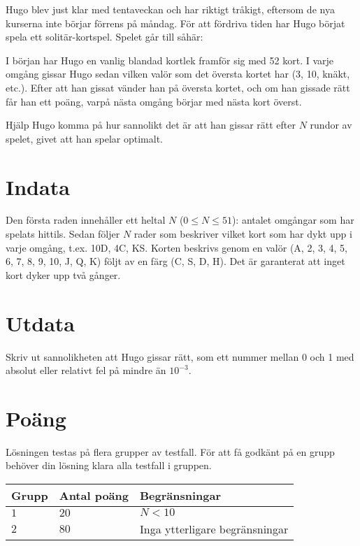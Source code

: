 Hugo blev just klar med tentaveckan och har riktigt tråkigt, eftersom de nya kurserna inte börjar förrens på måndag.
För att fördriva tiden har Hugo börjat spela ett solitär-kortspel. Spelet går till såhär:

I början har Hugo en vanlig blandad kortlek framför sig med 52 kort. I varje omgång gissar Hugo sedan vilken valör som det översta kortet har (3, 10, knäkt, etc.).
Efter att han gissat vänder han på översta kortet, och om han gissade rätt får han ett poäng, varpå nästa omgång börjar med nästa kort överst.

Hjälp Hugo komma på hur sannolikt det är att han gissar rätt efter $N$ rundor av spelet, givet att han spelar optimalt.

\section*{Indata}
Den första raden innehåller ett heltal $N$ ($0 \le N \le 51$): antalet omgångar som har spelats hittils.
Sedan följer $N$ rader som beskriver vilket kort som har dykt upp i varje omgång, t.ex. 10D, 4C, KS.
Korten beskrivs genom en valör (A, 2, 3, 4, 5, 6, 7, 8, 9, 10, J, Q, K) följt av en färg (C, S, D, H).
Det är garanterat att inget kort dyker upp två gånger.

\section*{Utdata}
Skriv ut sannolikheten att Hugo gissar rätt, som ett nummer mellan 0 och 1 med absolut eller relativt fel på mindre än $10^{-3}$.

\section*{Poäng}
Lösningen testas på flera grupper av testfall. För att få godkänt på en grupp behöver din lösning
klara alla testfall i gruppen.

\noindent
\begin{tabular}{| l | l | p{12cm} |}
  \hline
  \textbf{Grupp} & \textbf{Antal poäng} & \textbf{Begränsningar} \\ \hline
  $1$    & $20$       & $N < 10$ \\ \hline
  $2$    & $80$       & Inga ytterligare begränsningar \\ \hline
\end{tabular}
